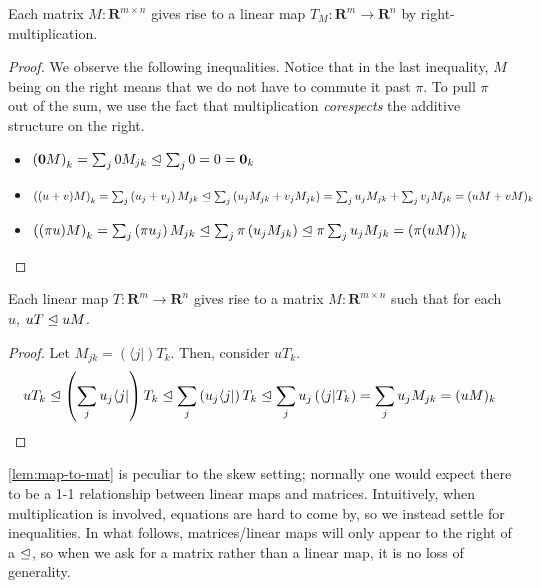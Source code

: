 \documentclass[submission,copyright,creativecommons]{eptcs}
\begin{document}
\begin{lemma}\label{lem:mat-to-map}
  Each matrix $M : \mathbf R^{m \times n}$ gives rise to a linear map
  $T_M : \mathbf R^m \to \mathbf R^n$ by right-multiplication.
\end{lemma}
\begin{proof}
  We observe the following inequalities.
  Notice that in the last inequality, $M$ being on the right means that we do
  not have to commute it past $\pi$.
  To pull $\pi$ out of the sum, we use the fact that multiplication
  \emph{corespects} the additive structure on the right.
  \begin{itemize}
    \item $\left(\mathbf{0}M\right)_{k}
      = \sum_j 0M_{jk}
      \trianglelefteq \sum_j 0
      = 0
      = \mathbf{0}_{k}$
    \item $\left((u + v)M\right)_{k}
      = \sum_j \left(u_j + v_j\right)M_{jk}
      \trianglelefteq \sum_j \left(u_jM_{jk} + v_jM_{jk}\right)
      = \sum_j u_jM_{jk} + \sum_j v_jM_{jk}
      = (uM + vM)_{k}$
    \item $\left((\pi u)M\right)_{k}
      = \sum_j \left(\pi u_j\right)M_{jk}
      \trianglelefteq \sum_j \pi\left(u_jM_{jk}\right)
      \trianglelefteq \pi\sum_j u_jM_{jk}
      = \left(\pi(uM)\right)_{k}$
  \end{itemize}
\end{proof}

\begin{lemma}\label{lem:map-to-mat}
  Each linear map $T : \mathbf R^m \to \mathbf R^n$ gives rise to a matrix
  $M : \mathbf R^{m \times n}$ such that for each $u$, $uT \trianglelefteq uM$.
\end{lemma}
\begin{proof}
  Let $M_{jk} = (\langle j \rvert)T_k$.
  Then, consider $uT_k$.
  \[
    uT_k \trianglelefteq \left(\sum_j u_j\langle j \rvert\right)T_k
    \trianglelefteq \sum_j \left(u_j\langle j \rvert\right) T_k
    \trianglelefteq \sum_j u_j\left(\langle j \rvert T_k\right)
    = \sum_j u_j M_{jk} = (uM)_k
  \]
\end{proof}

\autoref{lem:map-to-mat} is peculiar to the skew setting; normally one would expect there to be a 1-1 relationship between linear maps and matrices.
Intuitively, when multiplication is involved, equations are hard to come by, so
we instead settle for inequalities.
In what follows, matrices/linear maps will only appear to the right of a
$\trianglelefteq$, so when we ask for a matrix rather than a linear map, it is no loss
of generality.
\end{document}
